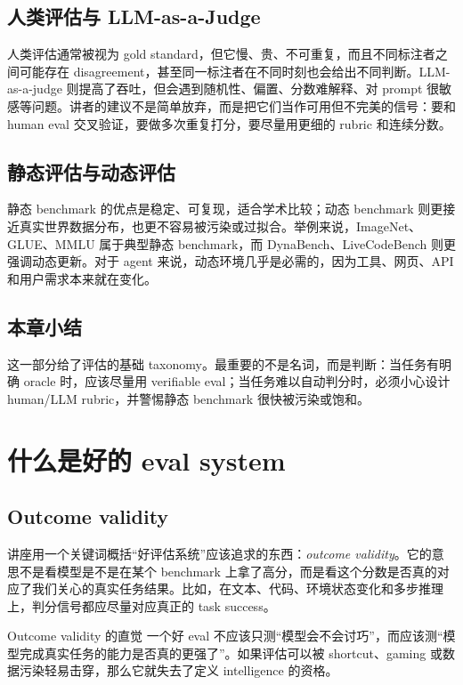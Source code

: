 \documentclass[a4paper]{article}
\begin{document}
\subsection{人类评估与 LLM-as-a-Judge}
人类评估通常被视为 gold standard，但它慢、贵、不可重复，而且不同标注者之间可能存在 disagreement，甚至同一标注者在不同时刻也会给出不同判断。LLM-as-a-judge 则提高了吞吐，但会遇到随机性、偏置、分数难解释、对 prompt 很敏感等问题。讲者的建议不是简单放弃，而是把它们当作可用但不完美的信号：要和 human eval 交叉验证，要做多次重复打分，要尽量用更细的 rubric 和连续分数。

\subsection{静态评估与动态评估}
静态 benchmark 的优点是稳定、可复现，适合学术比较；动态 benchmark 则更接近真实世界数据分布，也更不容易被污染或过拟合。举例来说，ImageNet、GLUE、MMLU 属于典型静态 benchmark，而 DynaBench、LiveCodeBench 则更强调动态更新。对于 agent 来说，动态环境几乎是必需的，因为工具、网页、API 和用户需求本来就在变化。

\subsection{本章小结}
这一部分给了评估的基础 taxonomy。最重要的不是名词，而是判断：当任务有明确 oracle 时，应该尽量用 verifiable eval；当任务难以自动判分时，必须小心设计 human/LLM rubric，并警惕静态 benchmark 很快被污染或饱和。

\section{什么是好的 eval system}
\subsection{Outcome validity}
讲座用一个关键词概括“好评估系统”应该追求的东西：\emph{outcome validity}。它的意思不是看模型是不是在某个 benchmark 上拿了高分，而是看这个分数是否真的对应了我们关心的真实任务结果。比如，在文本、代码、环境状态变化和多步推理上，判分信号都应尽量对应真正的 task success。

\begin{knowledgebox}{Outcome validity 的直觉}
一个好 eval 不应该只测“模型会不会讨巧”，而应该测“模型完成真实任务的能力是否真的更强了”。如果评估可以被 shortcut、gaming 或数据污染轻易击穿，那么它就失去了定义 intelligence 的资格。
\end{knowledgebox}
\end{document}

